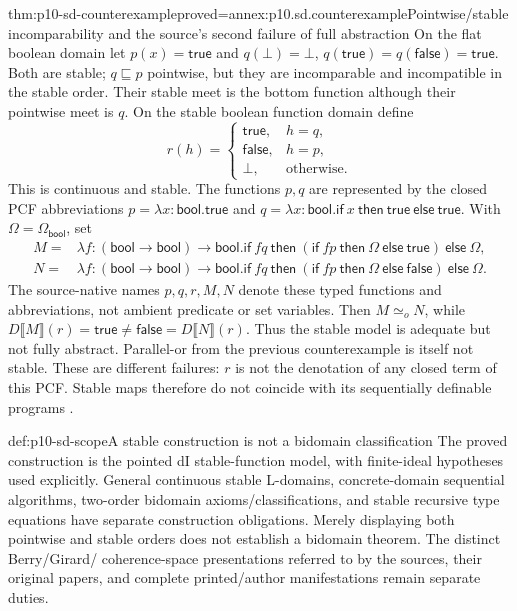 \begin{hbtheorem}{thm:p10-sd-counterexample}{proved=annex:p10.sd.counterexample}{Pointwise/stable incomparability and the source's second failure of full abstraction}
On the flat boolean domain let
\(p(x)=\mathsf{true}\) and
\(q(\bot)=\bot\), \(q(\mathsf{true})=q(\mathsf{false})=\mathsf{true}\).
Both are stable; \(q\sqsubseteq p\) pointwise, but they are incomparable
and incompatible in the stable order. Their stable meet is the bottom
function although their pointwise meet is \(q\). On the stable boolean function
domain define
\[
 r(h)=\begin{cases}\mathsf{true},&h=q,\\
                    \mathsf{false},&h=p,\\\bot,&\text{otherwise}.
       \end{cases}
\]
This is continuous and stable. The functions \(p,q\) are represented
by the closed PCF abbreviations
\(p=\lambda x:\mathsf{bool}.\mathsf{true}\) and
\(q=\lambda x:\mathsf{bool}.\mathsf{if}\ x\ \mathsf{then}\ \mathsf{true}\ \mathsf{else}\ \mathsf{true}\).
With \(\Omega=\Omega_{\mathsf{bool}}\), set
\[
 \begin{split}
 M={}&\lambda f:(\mathsf{bool}\to\mathsf{bool})\to\mathsf{bool}.
    \mathsf{if}\ f q\ \mathsf{then}\
    (\mathsf{if}\ f p\ \mathsf{then}\ \Omega\ \mathsf{else}\ \mathsf{true})
       \ \mathsf{else}\ \Omega,\\
 N={}&\lambda f:(\mathsf{bool}\to\mathsf{bool})\to\mathsf{bool}.
    \mathsf{if}\ f q\ \mathsf{then}\
    (\mathsf{if}\ f p\ \mathsf{then}\ \Omega\ \mathsf{else}\ \mathsf{false})
       \ \mathsf{else}\ \Omega.
 \end{split}
\]
The source-native names \(p,q,r,M,N\) denote these typed functions
and abbreviations, not ambient predicate or set variables.
Then \(M\simeq_o N\), while
\(D\llbracket M\rrbracket(r)=\mathsf{true}\ne\mathsf{false}=D\llbracket N\rrbracket(r)\).
Thus the stable model is adequate but not fully abstract. Parallel-or from
the previous counterexample is itself not stable. These are different
failures: \(r\) is not the denotation of any closed term of this PCF.
Stable maps therefore do not coincide with its sequentially definable programs
\cite[p.~38]{Gunter1994TypesAuthorOA}.
\end{hbtheorem}

\begin{proofboundary}{def:p10-sd-scope}{A stable construction is not a bidomain classification}
The proved construction is the pointed dI stable-function model, with
finite-ideal hypotheses used explicitly. General continuous stable
L-domains, concrete-domain sequential algorithms, two-order bidomain
axioms/classifications, and stable recursive type equations have separate
construction obligations. Merely displaying both pointwise and stable
orders does not establish a bidomain theorem. The distinct Berry/Girard/
coherence-space presentations referred to by the sources, their original
papers, and complete printed/author manifestations remain separate duties.
\end{proofboundary}
